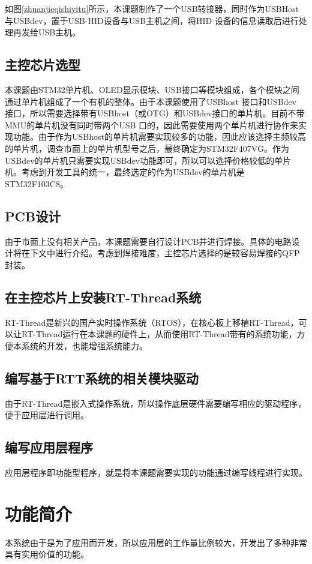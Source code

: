 
如图\ref{zhuanjieqishiyitu}所示，本课题制作了一个USB转接器，同时作为USBHost与USBdev，置于USB-HID设备与USB主机之间，将HID 设备的信息读取后进行处理再发给USB主机。


\subsection{主控芯片选型}
本课题由STM32单片机、OLED显示模块、USB接口等模块组成，各个模块之间通过单片机组成了一个有机的整体。由于本课题使用了USBhost 接口和USBdev 接口，所以需要选择带有USBhost（或OTG）和USBdev接口的单片机。目前不带MMU的单片机没有同时带两个USB 口的，因此需要使用两个单片机进行协作来实现功能。由于作为USBhost的单片机需要实现较多的功能，因此应该选择主频较高的单片机，调查市面上的单片机型号之后，最终确定为STM32F407VG。作为USBdev的单片机只需要实现USBdev功能即可，所以可以选择价格较低的单片机。考虑到开发工具的统一，最终选定的作为USBdev的单片机是STM32F103C8。

\subsection{PCB设计}
由于市面上没有相关产品，本课题需要自行设计PCB并进行焊接。具体的电路设计将在下文中进行介绍。考虑到焊接难度，主控芯片选择的是较容易焊接的QFP 封装。

\subsection{在主控芯片上安装RT-Thread系统}
RT-Thread是新兴的国产实时操作系统（RTOS），在核心板上移植RT-Thread，可以让RT-Thread运行在本课题的硬件上，从而使用RT-Thread带有的系统功能，方便本系统的开发，也能增强系统能力。

\subsection{编写基于RTT系统的相关模块驱动}
由于RT-Thread是嵌入式操作系统，所以操作底层硬件需要编写相应的驱动程序，便于应用层进行调用。

\subsection{编写应用层程序}

应用层程序即功能型程序，就是将本课题需要实现的功能通过编写线程进行实现。

\section{功能简介}
本系统由于是为了应用而开发，所以应用层的工作量比例较大，开发出了多种非常具有实用价值的功能。

